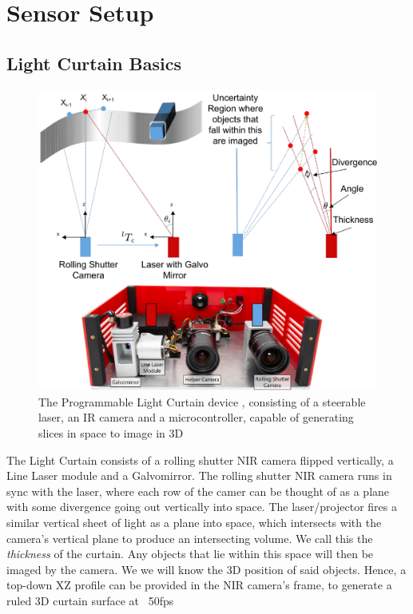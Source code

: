 
\section{Sensor Setup}

\subsection{Light Curtain Basics}

\begin{figure}[h]
   \centering
   \begin{minipage}{0.5\textwidth}
       \centering
       \includegraphics[width=1.0\textwidth]{figures/LC.pdf} %
   \end{minipage}\hfill
   \centering
   \caption{The Programmable Light Curtain device \cite{bartels2019Agile}, consisting of a steerable laser, an IR camera and a microcontroller, capable of generating slices in space to image in 3D}
\end{figure}

The Light Curtain consists of a rolling shutter NIR camera flipped vertically, a Line Laser module and a Galvomirror. The rolling shutter NIR camera runs in sync with the laser, where each row of the camer can be thought of as a plane with some divergence going out vertically into space. The laser/projector fires a similar vertical sheet of light as a plane into space, which intersects with the camera's vertical plane to produce an intersecting volume. We call this the \textit{thickness} of the curtain. Any objects that lie within this space will then be imaged by the camera. We we will know the 3D position of said objects. Hence, a top-down XZ profile can be provided in the NIR camera's frame, to generate a ruled 3D curtain surface at ~50fps

